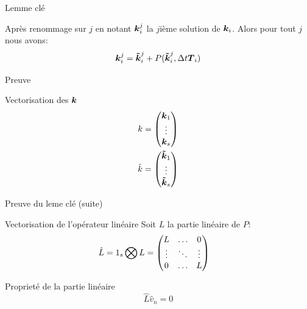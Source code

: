 \begin{frame}{Lemme clé}
\begin{lemma}
 Après renommage sur $j$ en notant ${\boldsymbol {k}}_{i}^{j}$ la $j$ième solution de ${\boldsymbol {k}}_{i}$.
Alors pour tout $j$ nous avons:
\begin{equation*}
  {\boldsymbol {k}}_{i}^{j}={\boldsymbol {\tilde{k}}}_{i}^{j}+P({\boldsymbol {\tilde{k}}}_{i}^{j},\Delta t {\boldsymbol {T}}_{i})
\end{equation*}
\end{lemma}
\begin{block}{Preuve}
\end{block}

 \begin{block}{Vectorisation des ${\boldsymbol {k}}$}
 \begin{align*}
k&=\begin{pmatrix}
    {\boldsymbol {k}}_{1}\\
    \vdots\\
    {\boldsymbol {k}}_{s}\\
  \end{pmatrix}\\
\tilde{k}&=\begin{pmatrix}
    {\boldsymbol {\tilde{k}}}_{1}\\
    \vdots\\
    {\boldsymbol {\tilde{k}}}_{s}\\
  \end{pmatrix}
\end{align*}
 \end{block}


\end{frame}

\begin{frame}{Preuve du leme clé (suite)}
 \begin{block}{Vectorisation de l'opérateur linéaire}
 Soit $L$ la partie linéaire de $P$:
\begin{align*}
\hat{L}&=1_{s}\bigotimes L=\begin{pmatrix}L	&\ldots	&0\\
			\vdots &\ddots 	&\vdots\\
			0	&\ldots	&L\\
	\end{pmatrix}
\end{align*}
\end{block}
\begin{block}{Proprieté de la partie linéaire}
\begin{equation*}
\hat{L}\hat{v}_{n}=0
\end{equation*}
 \end{block}

\end{frame}


